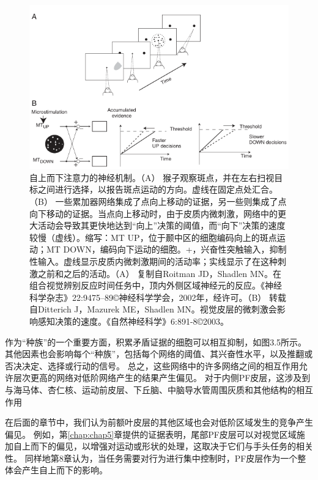 \begin{figure}[!htb]
	\centering
	\includegraphics{image_pfc/Fig_3_5}
	\caption*{自上而下注意力的神经机制。（A） 猴子观察斑点，并在左右扫视目标之间进行选择，以报告斑点运动的方向。虚线在固定点处汇合。（B） 一些累加器网络集成了点向上移动的证据，另一些则集成了点向下移动的证据。当点向上移动时，由于皮质内微刺激，网络中的更大活动会导致其更快地达到“向上”决策的阈值，而“向下”决策的速度较慢（虚线）。缩写：MT UP，位于颞中区的细胞编码向上的斑点运动；MT DOWN，编码向下运动的细胞。+，兴奋性突触输入，抑制性输入。虚线显示皮质内微刺激期间的活动率；实线显示了在这种刺激之前和之后的活动。（A） 复制自Roitman JD，Shadlen MN。在组合视觉辨别反应时间任务中，顶内外侧区域神经元的反应。《神经科学杂志》22:9475–89©神经科学学会，2002年，经许可。（B） 转载自Ditterich J，Mazurek ME，Shadlen MN。视觉皮层的微刺激会影响感知决策的速度。《自然神经科学》6:891-8©2003。}
	\label{fig:fig}
\end{figure}


作为“种族”的一个重要方面，积累矛盾证据的细胞可以相互抑制，如图3.5所示。
其他因素也会影响每个“种族”，包括每个网络的阈值、其兴奋性水平，以及推翻或否决决定、选择或行动的信号。
总之，这些网络中的许多网络之间的相互作用允许层次更高的网络对低阶网络产生的结果产生偏见。
对于内侧PF皮层，这涉及到与海马体、杏仁核、运动前皮层、下丘脑、中脑导水管周围灰质和其他结构的相互作用\par


在后面的章节中，我们认为前额叶皮层的其他区域也会对低阶区域发生的竞争产生偏见。
例如，第\ref{chap:chap5}章提供的证据表明，尾部PF皮层可以对视觉区域施加自上而下的偏见，以增强对运动或形状的处理，这取决于它们与手头任务的相关性。
同样地第8章认为，当任务需要对行为进行集中控制时，PF皮层作为一个整体会产生自上而下的影响。\par



